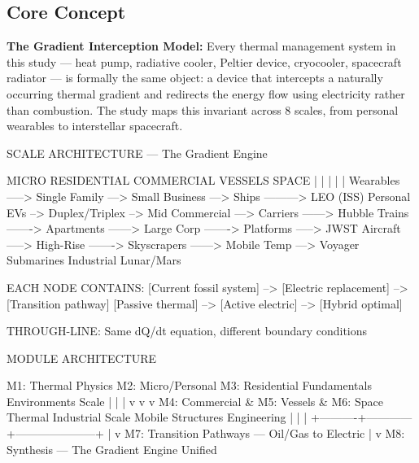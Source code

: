 \documentclass[11pt,letterpaper]{article}
\begin{document}
\subsection{Core Concept}

\textbf{The Gradient Interception Model:} Every thermal management system in this study --- heat pump, radiative cooler, Peltier device, cryocooler, spacecraft radiator --- is formally the same object: a device that intercepts a naturally occurring thermal gradient and redirects the energy flow using electricity rather than combustion. The study maps this invariant across 8 scales, from personal wearables to interstellar spacecraft.

\begin{asciibox}
SCALE ARCHITECTURE — The Gradient Engine

MICRO            RESIDENTIAL        COMMERCIAL          VESSELS           SPACE
|                |                  |                   |                 |
Wearables -----> Single Family ---> Small Business ---> Ships ---------> LEO (ISS)
Personal EVs --> Duplex/Triplex --> Mid Commercial ---> Carriers ------> Hubble
Trains -------> Apartments ------> Large Corp -------> Platforms -----> JWST
Aircraft -----> High-Rise -------> Skyscrapers ------> Mobile Temp ---> Voyager
Submarines                         Industrial                            Lunar/Mars

EACH NODE CONTAINS:
  [Current fossil system] --> [Electric replacement] --> [Transition pathway]
  [Passive thermal]       --> [Active electric]      --> [Hybrid optimal]

THROUGH-LINE: Same dQ/dt equation, different boundary conditions
\end{asciibox}

\begin{asciibox}
MODULE ARCHITECTURE

  M1: Thermal Physics     M2: Micro/Personal    M3: Residential
  Fundamentals            Environments          Scale
       |                       |                     |
       v                       v                     v
  M4: Commercial &        M5: Vessels &         M6: Space Thermal
  Industrial Scale        Mobile Structures     Engineering
       |                       |                     |
       +----------+------------+---------------------+
                  |
                  v
          M7: Transition Pathways — Oil/Gas to Electric
                  |
                  v
          M8: Synthesis — The Gradient Engine Unified
\end{asciibox}
\end{document}
